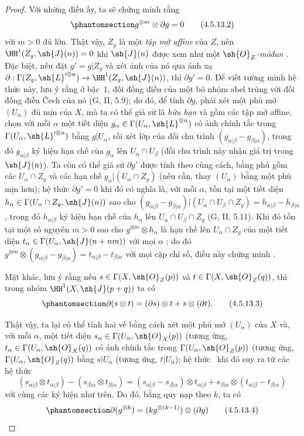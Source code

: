 \documentclass[oneside,10pt]{amsart}
\makeatletter
\newcommand{\ega@arrow}[2]{\mathchoice{#1}{#2}{#2}{#2}}
\renewcommand{\to}{\ega@arrow{\longrightarrow}{\rightarrow}}
\let\EGAOriginalLabel\label
\renewcommand{\label}[1]{\phantomsection\EGAOriginalLabel{#1}}
\makeatother
\begin{document}
\begin{proof}
  Với những điều ấy, ta sẽ chứng minh rằng
  \[
  \label{II.4.5.13.2}
    g^{\otimes m}\otimes\partial g=0
  \tag{4.5.13.2}
  \]
  với $m>0$ đủ lớn.
  Thật vậy, $Z_g$ là một \emph{tập mở affine} của $Z$, nên $\HH^1(Z_g,\sh{J}(n))=0$ khi $\sh{J}(n)$ được xem như một \emph{$\sh{O}_Z$-môđun} .
  Đặc biệt, nếu đặt $g'=g|Z_g$ và xét ảnh của nó qua ánh xạ $\partial:\Gamma(Z_g,\sh{L}'^{\otimes n})\to\HH^1(Z_g,\sh{J}(n))$, thì $\partial g'=0$.
  Để viết tường minh hệ thức này, lưu ý rằng ở bậc~$1$, đối đồng điều của một bó nhóm abel trùng với đối đồng điều \v{C}ech của nó (G, II, 5.9);
  do đó, để tính $\partial g$, phải xét một phủ mở $(U_\alpha)$ đủ mịn của $X$, mà ta có thể giả sử là \emph{hữu hạn} và gồm các tập mở affine, chọn với mỗi $\alpha$ một tiết diện $g_\alpha\in\Gamma(U_\alpha,\sh{L}^{\otimes n})$ có ảnh chính tắc trong $\Gamma(U_\alpha,\sh{L}'^{\otimes n})$ bằng $g|U_\alpha$, rồi xét lớp của đối chu trình $(g_{\alpha|\beta}-g_{\beta|\alpha})$, trong đó $g_{\alpha|\beta}$ ký hiệu hạn chế của $g_\alpha$ lên $U_\alpha\cap U_\beta$ (đối chu trình này nhận giá trị trong $\sh{J}(n)$).
  Ta còn có thể giả sử $\partial g'$ được tính theo cùng cách, bằng phủ gồm các $U_\alpha\cap Z_g$ và các hạn chế $g_\alpha|(U_\alpha\cap Z_g)$ (nếu cần, thay $(U_\alpha)$ bằng một phủ mịn hơn);
  hệ thức $\partial g'=0$ khi đó có nghĩa là, với mỗi $\alpha$, tồn tại một tiết diện $h_\alpha\in\Gamma(U_\alpha\cap Z_g,\sh{J}(n))$ sao cho $(g_{\alpha|\beta}-g_{\beta|\alpha})|(U_\alpha\cap U_\beta\cap Z_g)=h_{\alpha|\beta}-h_{\beta|\alpha}$, trong đó $h_{\alpha|\beta}$ ký hiệu hạn chế của $h_\alpha$ lên $U_\alpha\cap U_\beta\cap Z_g$ (G, II, 5.11).
  Khi đó tồn tại một số nguyên $m>0$ sao cho $g^{\otimes m}\otimes h_\alpha$ là hạn chế lên $U_\alpha\cap Z_g$ của một tiết diện $t_\alpha\in\Gamma(U_\alpha,\sh{J}(n+nm))$ với mọi $\alpha$ ;
  do đó $g^{\otimes m}\otimes(g_{\alpha|\beta}-g_{\beta|\alpha})=t_{\alpha|\beta}-t_{\beta|\alpha}$ với mọi cặp chỉ số, điều này chứng minh .

  Mặt khác, lưu ý rằng nếu $s\in\Gamma(X,\sh{O}_Z(p))$ và $t\in\Gamma(X,\sh{O}_Z(q))$, thì trong nhóm $\HH^1(X,\sh{J}(p+q))$ ta có
  \[
  \label{II.4.5.13.3}
    \partial(s\otimes t)=(\partial s)\otimes t+s\otimes(\partial t).
  \tag{4.5.13.3}
  \]

  Thật vậy, ta lại có thể tính hai vế bằng cách xét một phủ mở $(U_\alpha)$ của $X$ và, với mỗi $\alpha$, một tiết diện $s_\alpha\in\Gamma(U_\alpha,\sh{O}_X(p))$ (tương ứng, $t_\alpha\in\Gamma(U_\alpha,\sh{O}_X(q))$ có ảnh chính tắc trong $\Gamma(U_\alpha,\sh{O}_Z(p))$ (tương ứng, $\Gamma(U_\alpha,\sh{O}_Z(q))$ bằng $s|U_\alpha$ (tương ứng, $t|U_\alpha$);
  hệ thức~ khi đó suy ra từ các hệ thức
  \[
    (s_{\alpha|\beta}\otimes t_{\alpha|\beta})-(s_{\beta|\alpha}\otimes t_{\beta|\alpha})
    =(s_{\alpha|\beta}-s_{\beta|\alpha})\otimes t_{\alpha|\beta}+s_{\beta|\alpha}\otimes(t_{\alpha|\beta}-t_{\beta|\alpha})
  \]
  với cùng các ký hiệu như trên.
  Do đó, bằng quy nạp theo $k$, ta có
  \[
  \label{II.4.5.13.4}
    \partial(g^{\otimes k})=(kg^{\otimes(k-1)})\otimes(\partial g)
  \tag{4.5.13.4}
  \]


\end{proof}
\end{document}
